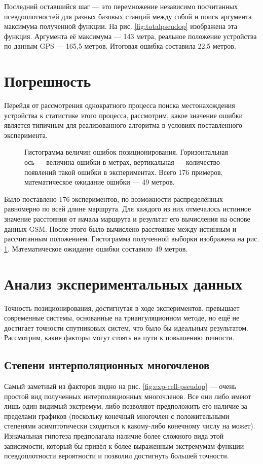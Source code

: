 Последний оставшийся шаг --- это перемножение независимо посчитанных псевдоплотностей для разных базовых станций между собой и поиск аргумента максимума полученной функции. На рис. \ref{fig:totalpseudop} изображена эта функция. Аргумента её максимума --- 143 метра, реальное положение устройства по данным GPS --- 165,5 метров. Итоговая ошибка составила 22,5 метров.

\section{Погрешность}
Перейдя от рассмотрения однократного процесса поиска местонахождения устройства к статистике этого процесса, рассмотрим, какое значение ошибки является типичным для реализованного алгоритма в условиях поставленного эксперимента.

\begin{figure}[h]
	\caption{Гистограмма величин ошибок позиционирования. Горизонтальная ось --- величина ошибки в метрах, вертикальная --- количество появлений такой ошибки в экспериментах. Всего 176 примеров, математическое ожидание ошибки --- 49 метров.}
	\label{fig:errhist}
\end{figure}

Было поставлено 176 экспериментов, по возможности распределённых равномерно по всей длине маршрута. Для каждого из них отмечалось истинное значение расстояния от начала маршрута и результат его вычисления на основе данных GSM. После этого было вычислено расстояние между истинным и рассчитанным положением. Гистограмма полученной выборки изображена на рис. \ref{fig:errhist}. Математическое ожидание ошибки составило 49 метров.

\section{Анализ экспериментальных данных}

Точность позиционирования, достигнутая в ходе экспериментов, превышает современные системы, основанные на триангуляционном методе, но ещё не достигает точности спутниковых систем, что было бы идеальным результатом. Рассмотрим, какие факторы могут стоять на пути к повышению точности.

\subsection{Степени интерполяционных многочленов}
\label{subsec:exp-order}
Самый заметный из факторов видно на рис. \ref{fig:exp-cell-pseudop} --- очень простой вид полученных интерполяционных многочленов. Все они либо имеют лишь один видимый экстремум, либо позволяют предположить его наличие за пределами графиков (поскольку конечный многочлен с положительными степенями асимптотически сходиться к какому-либо конечному числу на может). Изначальная гипотеза предполагала наличие более сложного вида этой зависимости, который бы привёл к более выраженным экстремумам функции псевдоплотности вероятности и позволил достигнуть большей точности.

